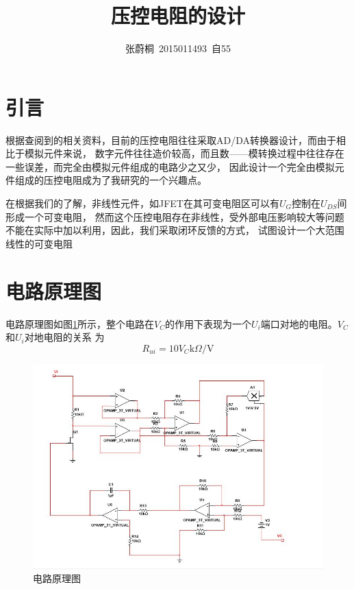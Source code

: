 \documentclass[UTF8,a4paper]{paper}
\title{压控电阻的设计}
\author{张蔚桐\ 2015011493\ 自55}
\begin{document}
\newenvironment{figurehere}
{\def\@captype{figure}}
{}
\newcommand{\tabincell}[2]{\begin{tabular}{@{}#1@{}}#2\end{tabular}}
\maketitle
\tableofcontents
\clearpage
\section{引言}
根据查阅到的相关资料，目前的压控电阻往往采取AD/DA转换器设计，而由于相比于模拟元件来说，
数字元件往往造价较高，而且数——模转换过程中往往存在一些误差，而完全由模拟元件组成的电路少之又少，
因此设计一个完全由模拟元件组成的压控电阻成为了我研究的一个兴趣点。

在根据我们的了解，非线性元件，如JFET在其可变电阻区可以有$U_G$控制在$U_{DS}$间形成一个可变电阻，
然而这个压控电阻存在非线性，受外部电压影响较大等问题不能在实际中加以利用，因此，我们采取闭环反馈的方式，
试图设计一个大范围线性的可变电阻

\section{电路原理图}
电路原理图如图\ref{1}所示，整个电路在$V_C$的作用下表现为一个$U_i$端口对地的电阻。$V_C$和$U_i$对地电阻的关系
为$$R_{ui}=10V_C\mathrm{k}\Omega/\mathrm{V}$$

\begin{figure}
\centering
\includegraphics[width=\textwidth]{1.jpg}
\caption{电路原理图}
\label{1}
\end{figure}
\end{document}
